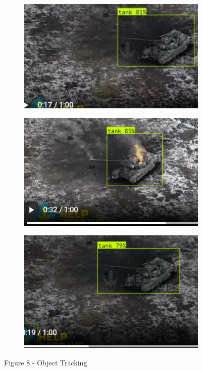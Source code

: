 \begin{figure}[H]
    \centering
    \begin{subfigure}[b]{0.33\textwidth}
        \centering
        \includegraphics[height=0.55\linewidth]{assets/23}
    \end{subfigure}\hfill
    \begin{subfigure}[b]{0.33\textwidth}
        \centering
        \includegraphics[height=0.55\linewidth]{assets/24}
    \end{subfigure}
    \begin{subfigure}[b]{0.33\textwidth}
        \centering
        \includegraphics[height=0.55\linewidth]{assets/25}
    \end{subfigure}
	\caption*{Figure 8 - Object Tracking}
\end{figure}

